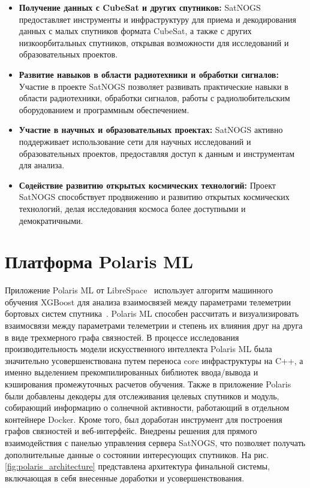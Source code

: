 \documentclass[14pt, a4paper]{../cls/coursework}
\begin{document}
    \begin{itemize}
        \item \textbf{Получение данных с CubeSat и других спутников:} SatNOGS предоставляет инструменты и инфраструктуру для приема и декодирования данных с малых спутников формата CubeSat, а также с других низкоорбитальных спутников,  открывая возможности для исследований и образовательных проектов.
        \item \textbf{Развитие навыков в области радиотехники и обработки сигналов:} Участие в проекте SatNOGS позволяет развивать практические навыки в области радиотехники, обработки сигналов, работы с радиолюбительским оборудованием и программным обеспечением.
        \item \textbf{Участие в научных и образовательных проектах:} SatNOGS активно поддерживает использование сети для научных исследований и образовательных проектов, предоставляя доступ к данным и инструментам для анализа.
        \item \textbf{Содействие развитию открытых космических технологий:} Проект SatNOGS способствует продвижению и развитию открытых космических технологий, делая исследования космоса более доступными и демократичными.
    \end{itemize}

    \newpage


    \chapter{Платформа Polaris ML}

    Приложение Polaris ML от LibreSpace~\cite{librespace_docs} использует алгоритм машинного обучения XGBoost для анализа взаимосвязей между параметрами телеметрии бортовых систем спутника~\cite{ray_2002_bayesian}.
    Polaris ML способен рассчитать и визуализировать взаимосвязи между параметрами телеметрии и степень их влияния друг на друга в виде трехмерного графа связностей.
    В процессе исследования производительность модели искусственного интеллекта Polaris ML была значительно усовершенствована путем переноса core инфраструктуры на C++, а именно выделением прекомпилированных библиотек ввода/вывода и кэширования промежуточных расчетов обучения.
    Также в приложение Polaris были добавлены декодеры для отслеживания целевых спутников и модуль, собирающий информацию о солнечной активности, работающий в отдельном контейнере Docker.
    Кроме того, был доработан инструмент для построения графов связностей и веб-интерфейс.
    Внедрены решения для прямого взаимодействия с панелью управления сервера SatNOGS, что позволяет получать дополнительные данные о состоянии интересующих спутников.
    На рис. \ref{fig:polaris_architecture} представлена архитектура финальной системы, включающая в себя внесенные доработки и усовершенствования.
\end{document}
